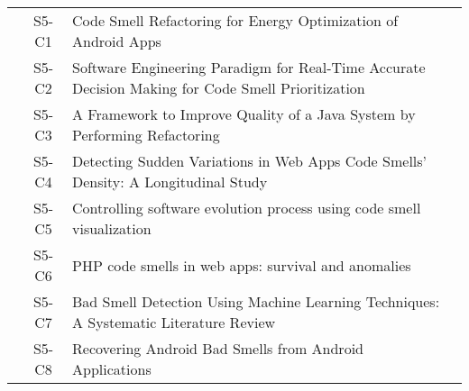 \begin{longtable}{ccp{9cm}p{3cm}}
    & S5-C1   & Code Smell Refactoring for Energy Optimization of Android Apps                                                                                                                                                                                 & \citeauthor*{Reeshti2021}     \\
    & S5-C2   & Software Engineering Paradigm for Real-Time Accurate Decision Making for Code Smell Prioritization                                                                                                                                             & \citeauthor*{Singh2021}       \\
    & S5-C3   & A Framework to Improve Quality of a Java System by Performing Refactoring                                                                                                                                                                      & \citeauthor*{singhAndBindal2020}       \\
    & S5-C4   & Detecting Sudden Variations in Web Apps Code Smells’ Density: A Longitudinal Study                                                                                                                                                             & \citeauthor*{Rio2021}         \\
    & S5-C5   & Controlling software evolution process using code smell visualization                                                                                                                                                                          & \citeauthor*{Nabilah2019}     \\
    & S5-C6   & PHP code smells in web apps: survival and anomalies                                                                                                                                                                                            & \citeauthor*{Rio2021}         \\
    & S5-C7   & Bad Smell Detection Using Machine Learning Techniques: A Systematic Literature Review                                                                                                                                                          & \citeauthor*{Al-Shaaby2020}   \\
    & S5-C8   & Recovering Android Bad Smells from Android Applications                                                                                                                                                                                        & \citeauthor*{Rasool2020}      \\

\end{longtable}
